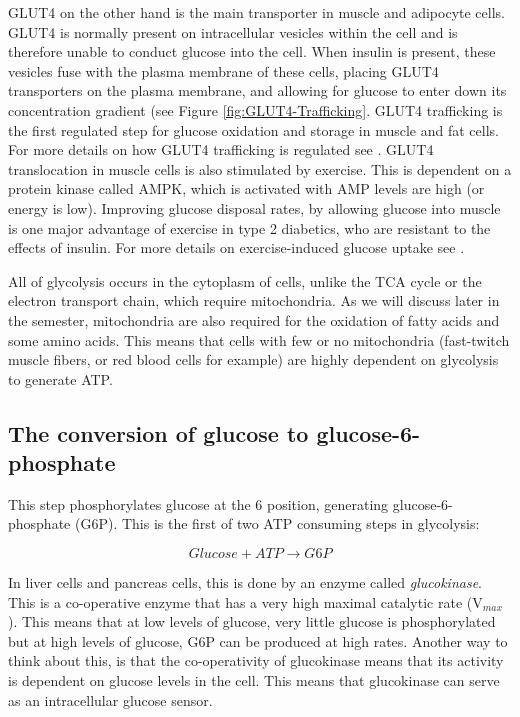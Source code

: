 \documentclass{tufte-handout}
\begin{document}
GLUT4 on the other hand is the main transporter in muscle and adipocyte cells.  GLUT4 is normally present on intracellular vesicles within the cell and is therefore unable to conduct glucose into the cell.  When insulin is present, these vesicles fuse with the plasma membrane of these cells, placing GLUT4 transporters on the plasma membrane, and allowing for glucose to enter down its concentration gradient (see Figure \ref{fig:GLUT4-Trafficking}.  GLUT4 trafficking is the first regulated step for glucose oxidation and storage in muscle and fat cells.  For more details on how GLUT4 trafficking is regulated see \citet{Leto2013}.  GLUT4 translocation in muscle cells is also stimulated by exercise.  This is dependent on a protein kinase called AMPK, which is activated with AMP levels are high (or energy is low).  Improving glucose disposal rates, by allowing glucose into muscle is one major advantage of exercise in type 2 diabetics, who are resistant to the effects of insulin.  For more details on exercise-induced glucose uptake see \citet{Richter2013}.


  All of glycolysis occurs in the cytoplasm of cells, unlike the TCA cycle or the electron transport chain, which require mitochondria.  As we will discuss later in the semester, mitochondria are also required for the oxidation of fatty acids and some amino acids.  This means that cells with few or no mitochondria (fast-twitch muscle fibers, or red blood cells for example) are highly dependent on glycolysis to generate ATP.

\subsection{The conversion of glucose to glucose-6-phosphate}

   This step phosphorylates glucose at the 6 position, generating glucose-6-phosphate (G6P).  This is the first of two ATP consuming steps in glycolysis:

\begin{equation}\label{eq:glucokinase}
Glucose + ATP \rightarrow G6P
\end{equation}

In liver cells and pancreas cells, this is done by an enzyme called \emph{glucokinase}.  This is a co-operative enzyme that has a very high maximal catalytic rate (V$_{max}$).  This means that at low levels of glucose, very little glucose is phosphorylated but at high levels of glucose, G6P can be produced at high rates. Another way to think about this, is that the co-operativity of glucokinase means that its activity is dependent on glucose levels in the cell.  This means that glucokinase can serve as an intracellular glucose sensor.
\end{document}
